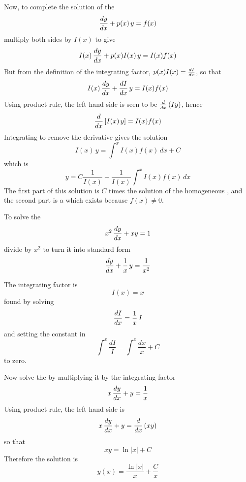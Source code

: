 Now, to complete the solution of the \ODE
$$\frac{dy}{dx}+p(x)\,y=f(x)$$
multiply both sides by $I(x)$ to give
$$I(x)\,\frac{dy}{dx}+p(x)I(x)\,y=I(x)f(x)$$
But from the definition of the integrating factor, $p(x)I(x)=\frac{dI}{dx}$, 
so that
$$I(x)\,\frac{dy}{dx}+\frac{dI}{dx}\,y=I(x)f(x)$$
Using product rule, the left hand side is seen to be 
$\frac{d}{d{x}}\left(Iy\right)$, hence
$$\frac{d}{d{x}}\left[I(x)\,y\right]=I(x)f(x)$$
Integrating to remove the derivative gives the solution
$$I(x)\,y=\int^x I(x)f(x)\,dx+C$$
which is
$$y=C\frac{1}{I(x)}+\frac{1}{I(x)}\int^x I(x)f(x)\,dx$$
The first part of this solution is $C$ times the solution of the homogeneous
\ODE, and the second part is a  which exists
because $f(x)\neq 0$.


\begin{example}
To solve the \ODE
$$x^2\,\frac{dy}{dx}+xy=1$$
divide by $x^2$ to turn it into standard form
$$\frac{dy}{dx}+\frac{1}{x}\,y=\frac{1}{x^2}$$

The integrating factor is 
$$I(x)=x$$
found by solving
$$\frac{dI}{dx}=\frac{1}{x}\,I$$
and setting the constant in
$$\int^x \frac{dI}{I}=\int^x\frac{dx}{x}+C$$
to zero.

Now solve the \ODE by multiplying it by the integrating factor
$$x\,\frac{dy}{dx}+y=\frac{1}{x}$$
Using product rule, the left hand side is
$$x\,\frac{dy}{dx}+y=\frac{d}{d{x}}\left(xy\right)$$
so that 
$$xy=\ln\left|x\right|+C$$
Therefore the solution is
$$y(x)=\frac{\ln\left|x\right|}{x}+\frac{C}{x}$$
\end{example}

